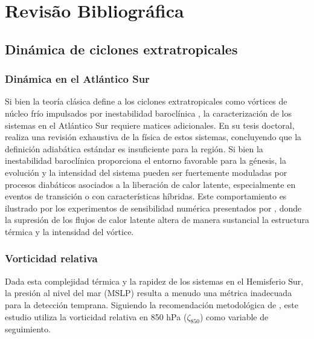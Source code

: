 \chapter{Revisão Bibliográfica}\label{cap:revbibliografica}
\section{Dinámica de ciclones extratropicales}\label{sec:mt_fundamentos}

\subsection{Dinámica en el Atlántico Sur}\label{subsec:mt_definicion}
Si bien la teoría clásica define a los ciclones extratropicales como vórtices de núcleo frío impulsados por inestabilidad baroclínica \citep{hoskins2002new}, la caracterización de los sistemas en el Atlántico Sur requiere matices adicionales. En su tesis doctoral, \citet{coutodesouza2024thesis} realiza una revisión exhaustiva de la física de estos sistemas, concluyendo que la definición adiabática estándar es insuficiente para la región. Si bien la inestabilidad baroclínica proporciona el entorno favorable para la génesis, la evolución y la intensidad del sistema pueden ser fuertemente moduladas por procesos diabáticos asociados a la liberación de calor latente, especialmente en eventos de transición o con características híbridas. Este comportamiento es ilustrado por los experimentos de sensibilidad numérica presentados por
\citet{reboita2022from}, donde la supresión de los flujos de calor latente altera de manera sustancial la estructura térmica y la intensidad del vórtice.

\subsection{Vorticidad relativa}\label{subsec:mt_vorticidad}
Dada esta complejidad térmica y la rapidez de los sistemas en el Hemisferio Sur, la presión al nivel del mar (MSLP) resulta a menudo una métrica inadecuada para la detección temprana. Siguiendo la recomendación metodológica de \citet{sinclair1997objective}, este estudio utiliza la vorticidad relativa en 850 hPa ($\zeta_{850}$) como variable de seguimiento.

